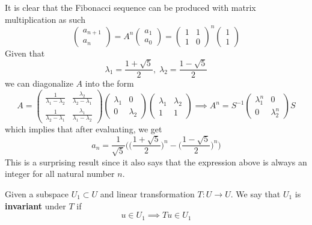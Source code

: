   \begin{example}
    It is clear that the Fibonacci sequence can be produced with matrix multiplication as such 
    \[ \begin{pmatrix}
    a_{n+1} \\ a_n
    \end{pmatrix} = A^n \begin{pmatrix}
    a_1 \\ a_0
    \end{pmatrix} = \begin{pmatrix}
    1&1\\1&0
    \end{pmatrix}^n \begin{pmatrix}
    1\\1
    \end{pmatrix}\]
    Given that 
    \[\lambda_1 = \frac{1+\sqrt{5}}{2}, \; \lambda_2 = \frac{1 - \sqrt{5}}{2}\]
    we can diagonalize $A$ into the form 
    \[A = \begin{pmatrix}
    \frac{1}{\lambda_1 - \lambda_2} & \frac{\lambda_2}{\lambda_2 - \lambda_1} \\
    \frac{1}{\lambda_2 - \lambda_1} & \frac{\lambda_1}{\lambda_1 - \lambda_2}
    \end{pmatrix} \begin{pmatrix}
    \lambda_1 & 0 \\ 0 & \lambda_2 
    \end{pmatrix} \begin{pmatrix}
    \lambda_1 & \lambda_2 \\
    1 & 1
    \end{pmatrix} \implies A^n = S^{-1} \begin{pmatrix}
    \lambda_1^n & 0 \\ 0 & \lambda_2^n 
    \end{pmatrix} S\]
    which implies that after evaluating, we get 
    \[ a_n = \frac{1}{\sqrt{5}} \bigg( \Big(\frac{1+\sqrt{5}}{2}\Big)^n - \Big(\frac{1-\sqrt{5}}{2}\Big)^n \bigg)\]
    This is a surprising result since it also says that the expression above is always an integer for all natural number $n$. 
  \end{example}

  \begin{definition}
    Given a subspace $U_1 \subset U$ and linear transformation $T: U \longrightarrow U$. We say that $U_1$ is \textbf{invariant} under $T$ if 
    \[u \in U_1 \implies T u \in U_1\]
  \end{definition}

